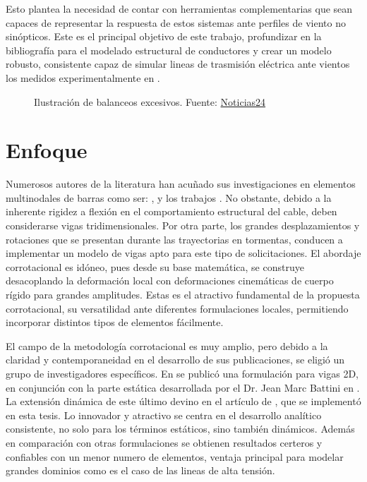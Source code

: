 Esto plantea la necesidad de contar con herramientas complementarias que sean capaces de representar la respuesta de estos sistemas ante perfiles de viento no sinópticos. Este es el principal objetivo de este trabajo, profundizar en la bibliografía para el modelado estructural de conductores y crear un modelo robusto, consistente capaz de simular lineas de trasmisión eléctrica ante vientos los medidos experimentalmente en \cite{stengel2017measurements}. 


\begin{figure}[htbp]
	\centering
	\def\svgwidth{100mm}
	
	\caption{Ilustración de balanceos excesivos. Fuente: \href{https://www.noticias24.com.uy/2019/06/dos-trabajadores-cayeron-de-una-altura.html}{Noticias24}}
	\label{fig:INTRO:IlusExcesiveBalance}
\end{figure}  

\section{Enfoque}

Numerosos autores de la literatura han acuñado sus investigaciones en elementos multinodales de barras como ser: \cite{desai1995finite}, \cite{yan2009numerical} y los trabajos \cite{gani2010dynamic} \cite{yang2016nonlinear}. No obstante, debido a la inherente rigidez a flexión en el comportamiento estructural del cable, deben considerarse vigas tridimensionales. Por otra parte, los grandes desplazamientos y rotaciones que se presentan durante las trayectorias en tormentas, conducen a implementar un modelo de vigas apto para este tipo de solicitaciones. El abordaje corrotacional es idóneo, pues desde su base matemática, se construye desacoplando la deformación local con deformaciones cinemáticas de cuerpo rígido para grandes amplitudes. Estas es el atractivo fundamental de la propuesta corrotacional, su versatilidad ante diferentes formulaciones locales, permitiendo incorporar distintos tipos de elementos fácilmente.

El campo de la metodología corrotacional es muy amplio, pero debido a la claridad y contemporaneidad en el desarrollo de sus publicaciones, se eligió un grupo de investigadores específicos. En \citep{Le2011} se publicó una formulación para vigas 2D, en conjunción con la parte estática desarrollada por el Dr. Jean Marc Battini  en \citep{Battini2002}. La extensión dinámica de este último devino en el artículo de \citep{Le2014}, que se implementó en esta tesis. Lo innovador y atractivo se centra en el desarrollo analítico consistente, no solo para los términos estáticos, sino también dinámicos. Además en comparación con otras formulaciones se obtienen resultados certeros y confiables con un menor numero de elementos, ventaja principal para modelar grandes dominios como es el caso de las lineas de alta tensión.  


